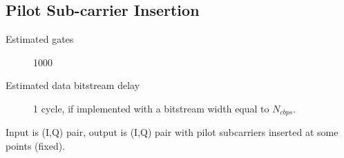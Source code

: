

\subsection{Pilot Sub-carrier Insertion}
\label{sec:pilot}
\begin{description}
	\item[Estimated gates] 1000
	\item[Estimated data bitstream delay] 1 cycle, if implemented with a bitstream width equal to $N_{cbps}$.
\end{description}

Input is (I,Q) pair, output is (I,Q) pair with pilot subcarriers
inserted at some points (fixed).


